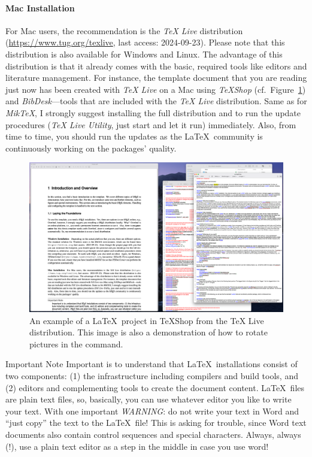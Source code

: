 \paragraph*{Mac Installation}
For Mac users, the recommendation is the \emph{TeX Live} distribution (\url{https://www.tug.org/texlive}, last access: 2024-09-23). Please note that this distribution is also available for Windows and Linux. The advantage of this distribution is that it already comes with the basic, required tools like editors and literature management. For instance, the template document that you are reading just now has been created with \emph{TeX Live} on a Mac using \emph{TeXShop} (cf.\ Figure~\ref{fig:texshop}) and \emph{BibDesk}---tools that are included with the \emph{TeX Live} distribution. Same as for \emph{MikTeX}, I strongly suggest installing the full distribution and to run the update procedures (\emph{TeX Live Utility}, just start and let it run) immediately. Also, from time to time, you should run the updates as the \LaTeX\ community is continuously working on the packages' quality.
\begin{figure}[htbp]
	\centering
	\includegraphics[angle=90, height=0.90\textheight]{figs/latext-edit.png}
	\caption[An example of a \LaTeX\ project in TeXShop from the TeX Live distribution]{An example of a \LaTeX\ project in TeXShop from the TeX Live distribution. This image is also a demonstration of how to rotate pictures in the  command.}
	\label{fig:texshop}
\end{figure}

\begin{MyBox}{Important Note}
	Important is to understand that \LaTeX\ installations consist of two components: (1) the infrastructure including compilers and build tools, and (2) editors and complementing tools to create the document content. \LaTeX\ files are plain text files, so, basically, you can use whatever editor you like to write your text.  With one important \emph{WARNING}: do not write your text in Word and ``just copy'' the text to the \LaTeX\ file! This is asking for trouble, since Word text documents also contain control sequences and special characters. Always, always (!), use a plain text editor as a step in the middle in case you use word!
\end{MyBox}

